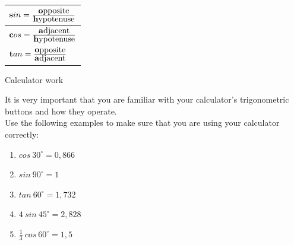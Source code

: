 \begin{table}[H]
\begin{center}
\label{m39408*id79953}
\noindent

\begin{tabular}{|l|}\hline

$\mathbf{s}in=\frac{\mbox{\textbf{o}pposite}}{\mbox{\textbf{h}ypotenuse}} $

\\  \hline

$\mathbf{c}os=\frac{\mbox{\textbf{a}djacent}}{\mbox{\textbf{h}ypotenuse}} $

\\ \hline

$\mathbf{t}an=\frac{\mbox{\textbf{o}pposite}}{\mbox{\textbf{a}djacent}} $

\\   \hline
\end{tabular}
\end{center}
\end{table}
\par


\begin{activity}{Calculator work}

It is very important that you are familiar with your calculator's trigonometric buttons and how they operate. \\
Use the following examples to make sure that you are using your calculator correctly:
\begin{enumerate}[noitemsep, label=\textbf{\arabic*}. ] 
 \item $cos~ 30^{\circ} = 0,866$
\item $sin~90^{\circ} = 1$
\item $tan~60^{\circ} = 1,732$
\item $4~sin~45^{\circ}=2,828$
\item $\frac{1}{3}~cos~60^{\circ}=1,5$
\end{enumerate}

\end{activity}

